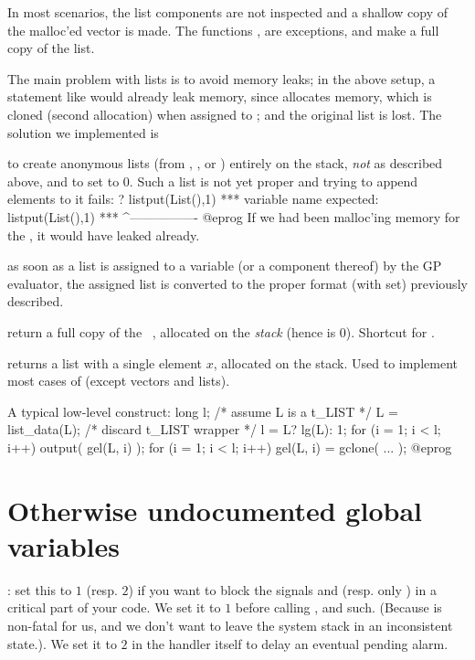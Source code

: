 In most  scenarios, the list components are not inspected
and a shallow copy of the malloc'ed vector is made. The functions
,  are exceptions, and make a full copy of
the list.

The main problem with lists is to avoid memory leaks; in the above setup,
a statement like  would already leak memory, since
 allocates memory, which is cloned (second allocation) when
assigned to ; and the original list is lost. The solution we
implemented is

\item to create anonymous lists (from , ,
 or ) entirely on the stack, \emph{not} as described
above, and to set  to $0$. Such a list is not yet proper and
trying to append elements to it fails:
\bprog
? listput(List(),1)
  ***   variable name expected: listput(List(),1)
  ***                                   ^----------------
@eprog\noindent
If we had been malloc'ing memory for the
, it would have leaked already.

\item as soon as a list is assigned to a variable (or a component thereof)
by the GP evaluator, the assigned list is converted to the proper format
(with  set) previously described.

 return a full copy of the ~,
allocated on the \emph{stack} (hence  is $0$). Shortcut for
.

 returns a list with a single element $x$,
allocated on the stack. Used to implement most cases of 
(except vectors and lists).

A typical low-level construct:
\bprog
  long l;
  /* assume L is a t_LIST */
  L = list_data(L); /* discard t_LIST wrapper */
  l = L? lg(L): 1;
  for (i = 1; i < l; i++) output( gel(L, i) );
  for (i = 1; i < l; i++) gel(L, i) = gclone( ... );
@eprog\noindent

\section{Otherwise undocumented global variables}

: set this to $1$ (resp. $2$) if you want to block
the signals  and  (resp. only ) in a
critical part of your code.
We set it to $1$ before calling ,  and such. (Because
 is non-fatal for us, and we don't want to leave the system stack
in an inconsistent state.). We set it to $2$ in the  handler itself
to delay an eventual pending alarm.

